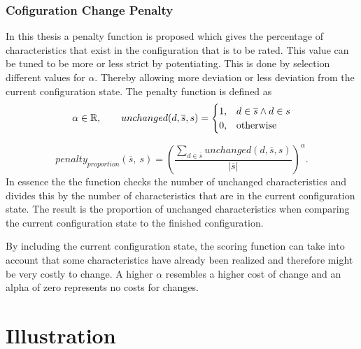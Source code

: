 \subsubsection{Cofiguration Change Penalty}
\label{subsubsec:Concept:SolutionGeneration:ScoringFunction:Penalty}

In this thesis a penalty function is proposed which gives the percentage of characteristics that exist in the configuration that is to be rated. This value can be tuned to be more or less strict by potentiating. This is done by selection different values for $\alpha$. Thereby allowing more deviation or less deviation from the current configuration state. The penalty function is defined as
\begin{equation}
    \notag \alpha \in \mathbb{R}, \qquad     unchanged(d,\overline{s}, s) = 
    \begin{cases}
      1, & d \in \overline{s} \land d \in s \\
      0, & \text{otherwise}
    \end{cases}
\end{equation}

\begin{equation}
    penalty_{proportion}(\overline{s},\ s) =  \left(\frac{\sum_{d \in \overline{s}} unchanged(d,\overline{s}, s)}{|\overline{s}|}\right)^\alpha.
\end{equation}
In essence the the function checks the number of unchanged characteristics and divides this by the number of characteristics that are in the current configuration state. The result is the proportion of unchanged characteristics when comparing the current configuration state to the finished configuration.

By including the current configuration state, the scoring function can take into account that some characteristics have already been realized and therefore might be very costly to change. A higher $\alpha$ resembles a higher cost of change and an alpha of zero represents no costs for changes.

\section{Illustration}
\label{sec:Concept:Illustration}

